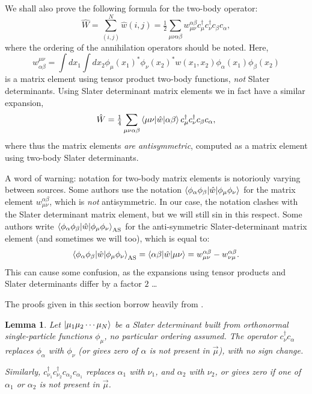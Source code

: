 \documentclass{report}
\theoremstyle{plain}
\newtheorem{lemma}{Lemma}[chapter]
\theoremstyle{definition}
\begin{document}
We shall also prove the following formula for the two-body operator:
\begin{equation}
  \hat{W} = \sum_{(i,j)}^N \hat{w}(i,j) = \tfrac{1}{2} \sum_{\mu\nu\alpha\beta}
  w^{\alpha\beta}_{\mu\nu} c^\dag_\mu c^\dag_\nu
  c_\beta c_\alpha, \label{eq:twobody-operator-rep} 
\end{equation}
where the ordering of the annihilation operators should be
noted. Here,
\begin{equation}
  w^{\mu\nu}_{\alpha\beta} = \int
  dx_1\int dx_2 \phi_\mu(x_1)^*\phi_\nu(x_2)^* w(x_1,x_2)
  \phi_\alpha(x_1)\phi_\beta(x_2) \label{eq:twobody-matelem}
\end{equation}
is a matrix element using tensor product two-body functions,
\emph{not} Slater determinants. Using Slater determinant matrix
elements we in fact have a similar expansion,
\begin{equation}
  \hat{W} = \tfrac{1}{4} \sum_{\mu\nu\alpha\beta}
  \braket{\mu\nu|\hat{w}|\alpha\beta} c^\dag_\mu c^\dag_\nu
  c_\beta c_\alpha, \label{eq:twobody-operator-rep-as} 
\end{equation}
where thus the matrix elements \emph{are antisymmetric}, computed as a matrix
element using two-body Slater determinants.

A word of warning: notation for two-body matrix elements is notoriouly
varying between sources. Some authors use the notation
$\braket{\phi_\alpha\phi_\beta|\hat{w}|\phi_\mu\phi_\nu}$ for the
matrix element $w^{\alpha\beta}_{\mu\nu}$, which is \emph{not}
antisymmetric. In our case, the notation clashes with the Slater
determinant matrix element, but we will still sin in this respect. Some authors write
$\braket{\phi_\alpha\phi_\beta|\hat{w}|\phi_\mu\phi_\nu}_\text{AS}$
for the anti-symmetric Slater-determinant matrix element (and
sometimes we will too), which is
equal to:
\begin{equation}
  \braket{\phi_\alpha\phi_\beta|\hat{w}|\phi_\mu\phi_\nu}_\text{AS} =
  \braket{\alpha\beta|\hat{w}|\mu\nu} = 
  w^{\alpha\beta}_{\mu\nu} - w^{\alpha\beta}_{\nu\mu}. \label{eq:twobody-matelem-as}
\end{equation}
This can cause some confusion, as the expansions using tensor products
and Slater determinants differ by a factor $2$ \ldots

The proofs given in this section borrow heavily from
\cite{HarrisMonkhorstFreeman}.


\begin{lemma}\label{lemma:replacement}
  Let $\ket{\mu_1\mu_2\cdots\mu_N}$ be a Slater determinant built from
  orthonormal single-particle functions $\phi_\mu$, no
  particular ordering assumed. The
  operator $c^\dag_\nu c_\alpha$ replaces $\phi_\alpha$ with $\phi_\nu$ (or
  gives zero of $\alpha$ is not present in $\vec{\mu}$),  with no sign change. 

  Similarly, $c^\dag_{\nu_1} c^\dag_{\nu_2} c_{\alpha_2} c_{\alpha_1}$
  replaces $\alpha_1$ with $\nu_1$, and $\alpha_2$ with $\nu_2$, or gives
  zero if one of $\alpha_1$ or $\alpha_2$ is not present in $\vec{\mu}$.
\end{lemma}
\end{document}
